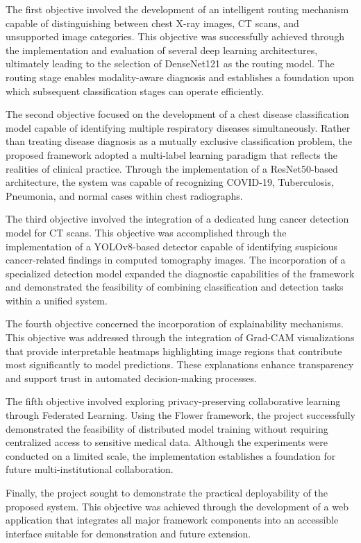 The first objective involved the development of an intelligent routing mechanism capable of distinguishing between chest X-ray images, CT scans, and unsupported image categories. This objective was successfully achieved through the implementation and evaluation of several deep learning architectures, ultimately leading to the selection of DenseNet121 as the routing model. The routing stage enables modality-aware diagnosis and establishes a foundation upon which subsequent classification stages can operate efficiently.

The second objective focused on the development of a chest disease classification model capable of identifying multiple respiratory diseases simultaneously. Rather than treating disease diagnosis as a mutually exclusive classification problem, the proposed framework adopted a multi-label learning paradigm that reflects the realities of clinical practice. Through the implementation of a ResNet50-based architecture, the system was capable of recognizing COVID-19, Tuberculosis, Pneumonia, and normal cases within chest radiographs.

The third objective involved the integration of a dedicated lung cancer detection model for CT scans. This objective was accomplished through the implementation of a YOLOv8-based detector capable of identifying suspicious cancer-related findings in computed tomography images. The incorporation of a specialized detection model expanded the diagnostic capabilities of the framework and demonstrated the feasibility of combining classification and detection tasks within a unified system.

The fourth objective concerned the incorporation of explainability mechanisms. This objective was addressed through the integration of Grad-CAM visualizations that provide interpretable heatmaps highlighting image regions that contribute most significantly to model predictions. These explanations enhance transparency and support trust in automated decision-making processes.

The fifth objective involved exploring privacy-preserving collaborative learning through Federated Learning. Using the Flower framework, the project successfully demonstrated the feasibility of distributed model training without requiring centralized access to sensitive medical data. Although the experiments were conducted on a limited scale, the implementation establishes a foundation for future multi-institutional collaboration.

Finally, the project sought to demonstrate the practical deployability of the proposed system. This objective was achieved through the development of a web application that integrates all major framework components into an accessible interface suitable for demonstration and future extension.

